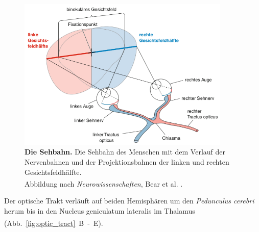 \documentclass[12pt,a4paper,pdftex]{article}
\begin{document}
\begin{figure}[H]
    \centering
    \includegraphics[width = 0.9\textwidth]{pictures/visual/Sehbahn.png}
    \caption[Die Sehbahn]{\textbf{Die Sehbahn.} Die Sehbahn des Menschen mit dem Verlauf der Nervenbahnen und der Projektionsbahnen der linken und rechten Gesichtsfeldhälfte.\\
    Abbildung nach \textit{Neurowissenschaften}, Bear et al. \textsuperscript{\cite[10]{neurowissenschaften_baer}}.}
    \label{fig:sehbahn_baer}
\end{figure}

Der optische Trakt verläuft auf beiden Hemisphären um den \textit{Pedunculus cerebri} herum bis in den Nucleus geniculatum lateralis im Thalamus (Abb.~\ref{fig:optic_tract}~B~-~E). \textsuperscript{\cite[15]{crossman2014neuroanatomy}}
\end{document}
